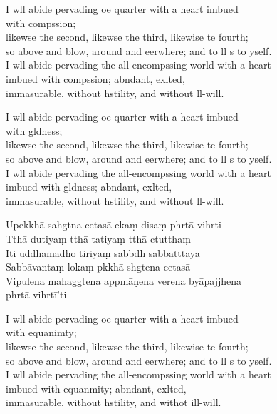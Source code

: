 I wll abide pervading oe quarter with a heart imbued\\
\vin with compssion;\\
likewse the second, likewse the third, likewise te fourth;\\
so above and blow, around and eerwhere; and to ll s to yself.\\
I wll abide pervading the all-encompssing world with a heart \\
imbued with compssion; abndant, exlted,\\
\vin immasurable, without hstility, and without ll-will.

I wll abide pervading oe quarter with a heart imbued\\
\vin with gldness;\\
likewse the second, likewse the third, likewise te fourth;\\
so above and blow, around and eerwhere; and to ll s to yself.\\
I wll abide pervading the all-encompssing world with a heart \\
imbued with gldness; abndant, exlted,\\
\vin immasurable, without hstility, and without ll-will.


\clearpage

Upekkhā-sahgtna cetasā ekaṃ disaṃ phrtā vihrti\\%
Tthā dutiyaṃ tthā tatiyaṃ tthā ctutthaṃ\\
Iti uddhamadho tiriyaṃ sabbdh sabbatttāya\\
Sabbāvantaṃ lokaṃ pkkhā-shgtena cetasā\\
Vipulena mahaggtena appmāṇena verena byāpajjhena\\
\vin phrtā vihrtī'ti

\clearpage

I wll abide pervading oe quarter with a heart imbued\\%
\vin with equanimty;\\
likewse the second, likewse the third, likewise te fourth;\\
so above and blow, around and eerwhere; and to ll s to yself.\\
I wll abide pervading the all-encompssing world with a heart \\
imbued with equanmity; abndant, exlted,\\
\vin immasurable, without hstility, and withot ill-will.

